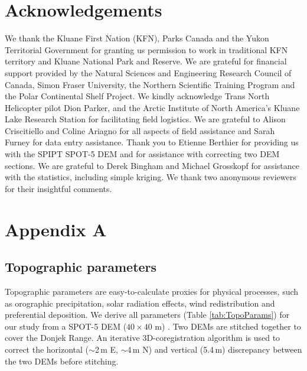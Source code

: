 \documentclass[twocolumn, letterpaper]{igs}
\begin{document}
\section{Acknowledgements}

We thank the Kluane First Nation (KFN), Parks Canada and the Yukon Territorial Government for granting us permission to work in traditional KFN territory and Kluane National Park and Reserve. We are grateful for financial support provided by the Natural Sciences and Engineering Research Council of  Canada, Simon Fraser University, the Northern Scientific  Training  Program and the Polar Continental Shelf Project. We kindly acknowledge Trans North Helicopter pilot Dion Parker, and the Arctic Institute of North America's Kluane Lake Research Station for facilitating field logistics. We are grateful to Alison Criscitiello and Coline Ariagno for all aspects of field assistance and Sarah Furney for data entry assistance. Thank you to Etienne Berthier for providing us with the SPIPT SPOT-5 DEM and for assistance with correcting two DEM sections. We are grateful to Derek Bingham and Michael Grosskopf for assistance with the statistics, including simple kriging. We thank two anonymous reviewers for their insightful comments.

%

%


\appendix
\section{Appendix A}
\subsection*{Topographic parameters}


Topographic parameters are easy-to-calculate proxies for physical processes, such as orographic precipitation, solar radiation effects, wind redistribution and preferential deposition. We derive all parameters (Table \ref{tab:TopoParams}) for our study from a SPOT-5 DEM ($40\times40$ m) \citep{Korona2009}. Two DEMs are stitched together to cover the Donjek Range. An iterative 3D-coregistration algorithm \citep{Berthier2007} is used to correct the horizontal ($\sim$2\,m E, $\sim$4\,m N) and vertical (5.4\,m) discrepancy between the two DEMs before stitching. 
\end{document}
